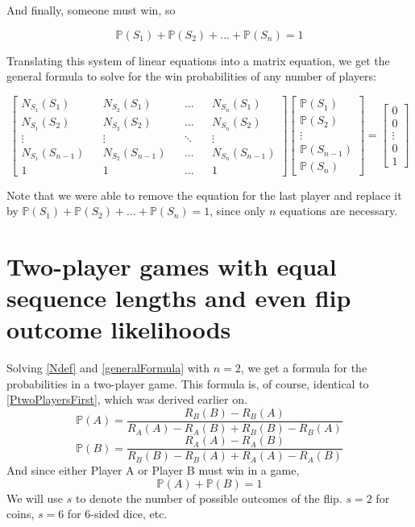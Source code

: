 \documentclass[english,12pt,a4paper,final]{article}
\begin{document}
And finally, someone must win, so 

\begin{equation*}
	\mathbb{P}(S_1) + \mathbb{P}(S_2) + ... + \mathbb{P}(S_n) = 1
\end{equation*}

Translating this system of linear equations into a matrix equation, we get the general formula to solve for the win probabilities of any number of players:

\begin{equation}\label{generalFormula}
	\begin{bmatrix}
		N_{S_1}(S_1) && N_{S_2}(S_1) && \dots && N_{S_n}(S_1) \\
		N_{S_1}(S_2) && N_{S_2}(S_2) && \dots && N_{S_n}(S_2) \\
		\vdots && \vdots && \ddots && \vdots \\
		N_{S_1}(S_{n-1}) && N_{S_2}(S_{n-1}) && \dots && N_{S_n}(S_{n-1}) \\
		1 && 1 && \dots && 1
	\end{bmatrix}
	\begin{bmatrix}
		\mathbb{P}(S_1) \\ \mathbb{P}(S_2) \\ \vdots \\ \mathbb{P}(S_{n-1}) \\  \mathbb{P}(S_n)
	\end{bmatrix}
	=
	\begin{bmatrix}
		0 \\ 0 \\ \vdots \\ 0 \\ 1
	\end{bmatrix}
\end{equation}

Note that we were able to remove the equation for the last player and replace it by $\mathbb{P}(S_1) + \mathbb{P}(S_2) + ... + \mathbb{P}(S_n) = 1$, since only $n$ equations are necessary.

\part{Two-player games with equal sequence lengths and even flip outcome likelihoods}\label{twoPlayerProofs}

Solving \eqref{Ndef} and \eqref{generalFormula} with $n=2$, we get a formula for the probabilities in a two-player game. This formula is, of course, identical to \eqref{PtwoPlayersFirst}, which was derived earlier on.
\begin{equation}\label{2playerAProb}
	\mathbb{P}(A)=\frac{R_B(B)-R_B(A)}{R_A(A)-R_A(B)+R_B(B)-R_B(A)}
\end{equation}
\begin{equation}\label{2playerBProb}
	\mathbb{P}(B)=\frac{R_A(A)-R_A(B)}{R_B(B)-R_B(A)+R_A(A)-R_A(B)}
\end{equation}
And since either Player A or Player B must win in a game,
\begin{equation*}
	\mathbb{P}(A)+\mathbb{P}(B)=1
\end{equation*}
We will use $s$ to denote the number of possible outcomes of the flip. $s=2$ for coins, $s=6$ for 6-sided dice, etc.
\end{document}
